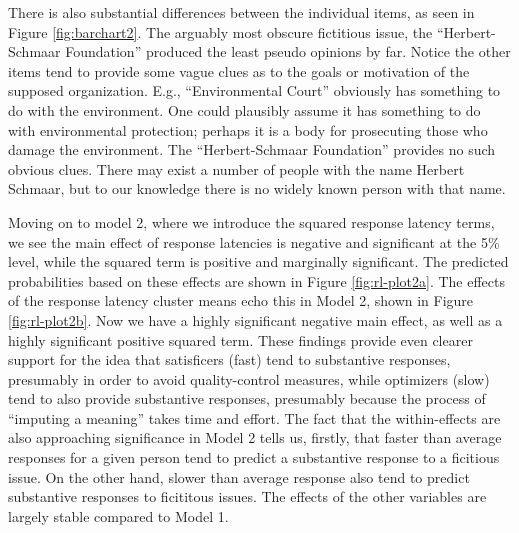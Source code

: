 \documentclass[Royal,times,sageh]{sagej}
\begin{document}
There is also substantial differences between the individual items, as
seen in Figure \ref{fig:barchart2}. The arguably most obscure fictitious
issue, the ``Herbert-Schmaar Foundation'' produced the least pseudo
opinions by far. Notice the other items tend to provide some vague clues
as to the goals or motivation of the supposed organization. E.g.,
``Environmental Court'' obviously has something to do with the
environment. One could plausibly assume it has something to do with
environmental protection; perhaps it is a body for prosecuting those who
damage the environment. The ``Herbert-Schmaar Foundation'' provides no
such obvious clues. There may exist a number of people with the name
Herbert Schmaar, but to our knowledge there is no widely known person
with that name.

Moving on to model 2, where we introduce the squared response latency
terms, we see the main effect of response latencies is negative and
significant at the 5\% level, while the squared term is positive and
marginally significant. The predicted probabilities based on these
effects are shown in Figure \ref{fig:rl-plot2a}. The effects of the
response latency cluster means echo this in Model 2, shown in Figure
\ref{fig:rl-plot2b}. Now we have a highly significant negative main
effect, as well as a highly significant positive squared term. These
findings provide even clearer support for the idea that satisficers
(fast) tend to substantive responses, presumably in order to avoid
quality-control measures, while optimizers (slow) tend to also provide
substantive responses, presumably because the process of ``imputing a
meaning'' takes time and effort. The fact that the within-effects are
also approaching significance in Model 2 tells us, firstly, that faster
than average responses for a given person tend to predict a substantive
response to a ficitious issue. On the other hand, slower than average
response also tend to predict substantive responses to ficititous
issues. The effects of the other variables are largely stable compared
to Model 1.
\end{document}
